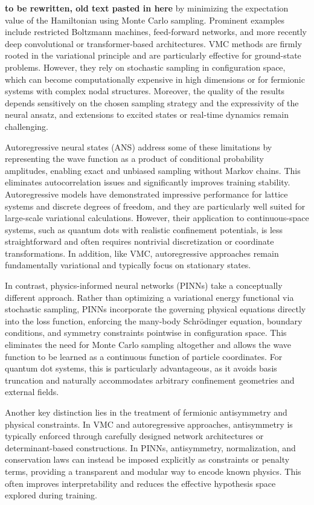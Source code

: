 \documentclass[superscriptaddress,unsortedaddress,amsmath,amssymb,aps]{revtex4-2}
\begin{document}
{\bf to be rewritten, old text pasted in here}\newline
by minimizing the expectation value of the Hamiltonian using Monte
Carlo sampling. Prominent examples include restricted Boltzmann
machines, feed-forward networks, and more recently deep convolutional
or transformer-based architectures. VMC methods are firmly rooted in
the variational principle and are particularly effective for
ground-state problems. However, they rely on stochastic sampling in
configuration space, which can become computationally expensive in
high dimensions or for fermionic systems with complex nodal
structures. Moreover, the quality of the results depends sensitively
on the chosen sampling strategy and the expressivity of the neural
ansatz, and extensions to excited states or real-time dynamics remain
challenging.

Autoregressive neural states (ANS) address some of these limitations
by representing the wave function as a product of conditional
probability amplitudes, enabling exact and unbiased sampling without
Markov chains. This eliminates autocorrelation issues and
significantly improves training stability. Autoregressive models have
demonstrated impressive performance for lattice systems and discrete
degrees of freedom, and they are particularly well suited for
large-scale variational calculations. However, their application to
continuous-space systems, such as quantum dots with realistic
confinement potentials, is less straightforward and often requires
nontrivial discretization or coordinate transformations. In addition,
like VMC, autoregressive approaches remain fundamentally variational
and typically focus on stationary states.

In contrast, physics-informed neural networks (PINNs) take a
conceptually different approach. Rather than optimizing a variational
energy functional via stochastic sampling, PINNs incorporate the
governing physical equations directly into the loss function,
enforcing the many-body Schrödinger equation, boundary conditions, and
symmetry constraints pointwise in configuration space. This eliminates
the need for Monte Carlo sampling altogether and allows the wave
function to be learned as a continuous function of particle
coordinates. For quantum dot systems, this is particularly
advantageous, as it avoids basis truncation and naturally accommodates
arbitrary confinement geometries and external fields.

Another key distinction lies in the treatment of fermionic
antisymmetry and physical constraints. In VMC and autoregressive
approaches, antisymmetry is typically enforced through carefully
designed network architectures or determinant-based constructions. In
PINNs, antisymmetry, normalization, and conservation laws can instead
be imposed explicitly as constraints or penalty terms, providing a
transparent and modular way to encode known physics. This often
improves interpretability and reduces the effective hypothesis space
explored during training.
\end{document}

